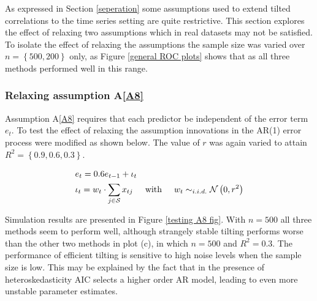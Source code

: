 \documentclass[11pt]{report}\usepackage[utf8]{inputenc}
\begin{document}
As expressed in Section \ref{seperation} some assumptions used to extend tilted correlations to the time series setting are quite restrictive. This section explores the effect of relaxing two assumptions which in real datasets may not be satisfied. To isolate the effect of relaxing the assumptions the sample size was varied over $n = \left \{ 500, 200 \right \}$ only, as Figure \ref{general ROC plots} shows that as all three methods performed well in this range. 

\subsubsection{Relaxing assumption A\ref{A8}}

Assumption A\ref{A8} requires that each predictor be independent of the error term $e_t$. To test the effect of relaxing the assumption innovations in the AR(1) error process were modified as shown below. The value of $r$ was again varied to attain $R^2 = \left \{ 0.9,0.6,0.3 \right \}$. 

\begin{align*}
    & e_t = 0.6e_{t-1} + \iota_t \\ 
    & \iota_t = w_t \cdot \sum_{j \in \mathcal{S}}x_{tj} \hspace{0.5cm} \text{with}\hspace{0.5cm} w_t \sim_{i.i.d.} \mathcal{N}\left ( 0,r^2 \right )
\end{align*}

Simulation results are presented in Figure \ref{testing A8 fig}. With $n = 500$ all three methods seem to perform well, although strangely stable tilting performs worse than the other two methods in plot (c), in which $n=500$ and $R^2=0.3$. The performance of efficient tilting is sensitive to high noise levels when the sample size is low. This may be explained by the fact that in the presence of heteroskedasticity AIC selects a higher order AR model, leading to even more unstable parameter estimates. 
\end{document}
